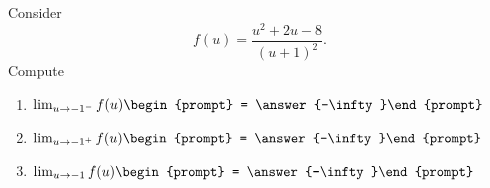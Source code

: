\documentclass{ximera}
\author{Bart Snapp}
\begin{document}
\begin{exercise}
Consider 
\[
f(u) = \frac{u^2+2 u-8}{(u+1)^2}.
\]
Compute
\begin{enumerate}
\item $\lim_{u\to -1^- } f(u) \begin{prompt} = \answer{-\infty}\end{prompt}$
\item $\lim_{u\to -1^+ } f(u) \begin{prompt} = \answer{-\infty}\end{prompt}$
\item $\lim_{u\to -1 } f(u) \begin{prompt} = \answer{-\infty}\end{prompt}$
\end{enumerate}
\end{exercise}
\end{document}
